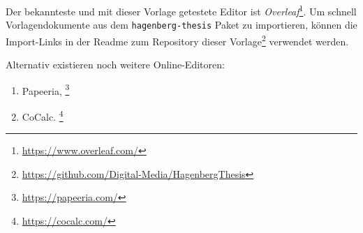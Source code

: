 Der bekannteste und mit dieser Vorlage getestete Editor ist \emph{Overleaf}\footnote{\url{https://www.overleaf.com/}}. Um schnell
Vorlagendokumente aus dem \texttt{hagenberg-thesis} Paket zu importieren, können die Import-Links in der Readme zum Repository
dieser Vorlage\footnote{\url{https://github.com/Digital-Media/HagenbergThesis}} verwendet werden.

Alternativ existieren noch weitere Online-Editoren:
%
\begin{enumerate}
	\item Papeeria,%
	\footnote{\url{https://papeeria.com/}}
	\item CoCalc.%
	\footnote{\url{https://cocalc.com/}}
\end{enumerate}
